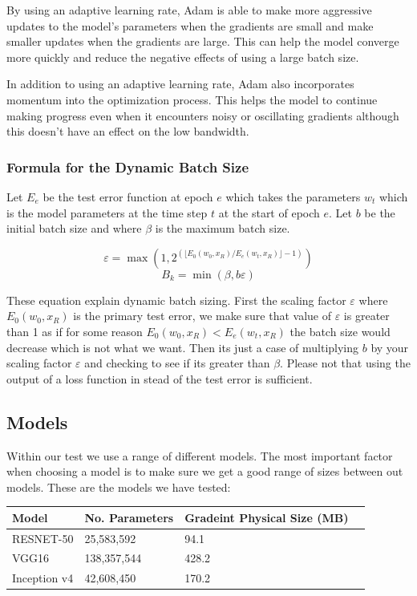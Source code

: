 \documentclass[11pt]{article}
\begin{document}
By using an adaptive learning rate, Adam is able to make more aggressive updates to the model's parameters when the gradients are small and make smaller updates when the gradients are large. This can help the model converge more quickly and reduce the negative effects of using a large batch size.
 
In addition to using an adaptive learning rate, Adam also incorporates momentum into the optimization process. This helps the model to continue making progress even when it encounters noisy or oscillating gradients although this doesn't have an effect on the low bandwidth.

\subsubsection{Formula for the Dynamic Batch Size}

Let $E_e$ be the test error function at epoch $e$ which takes the parameters $w_t$ which is the model parameters at the time step $t$ at the start of epoch $e$. Let $b$ be the initial batch size and where      $\beta$ is the maximum batch size.  

\begingroup
\Large
$$
\varepsilon = \max \left(1, 2^{(\lfloor E_0(w_0,x_R)/E_e(w_t, x_R) \rfloor -1)} \right)
$$
$$
B_k = \min \left(\beta,b\varepsilon\right)
$$
\endgroup

These equation explain dynamic batch sizing. First the scaling factor $\varepsilon$ where $E_0(w_0,x_R)$ is the primary test error, we make sure that value of $\varepsilon$ is greater than 1 as if for some reason $E_0(w_0,x_R) < E_e(w_t, x_R)$ the batch size would decrease which is not what we want. Then its just a case of multiplying $b$ by your scaling factor $\varepsilon$ and checking to see if its greater than $\beta$. Please not that using the output of a loss function in stead of the test error is sufficient.


\subsection{Models}
Within our test we use a range of different models. The most important factor when choosing a model is to make sure we get a good range of sizes between out models. These are the models we have tested:

\begin{center}
\begin{tabular}{| p{3cm} | p{3cm} | p{3cm} | p{3cm} |} 
\hline
Model & No. Parameters &  Gradeint Physical Size (MB)\\ \hline
RESNET-50 & 25,583,592 &  94.1 \\ \hline
VGG16 &  138,357,544 &  428.2 \\ \hline
Inception v4 & 42,608,450 &  170.2\\ \hline
\end{tabular}
\end{center}
\end{document}
